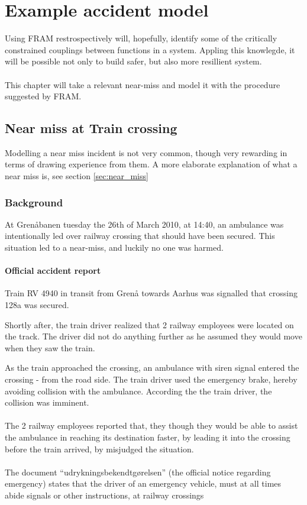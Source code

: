 \chapter{Example accident model}
\label{ch:accident_model}
Using FRAM restrospectively will, hopefully, identify some of the critically constrained couplings between functions in a system. Appling this knowlegde, it will be possible not only to build safer, but also more resillient system.\\
\\
This chapter will take a relevant near-miss and model it with the procedure suggested by FRAM. 

\section{Near miss at Train crossing}
Modelling a near miss incident is not very common, though very rewarding in terms of drawing experience from them. A more elaborate explanation of what a near miss is, see section \ref{sec:near_miss}


\subsection{Background}
At Grenåbanen tuesday the 26th of March 2010, at 14:40, an ambulance was intentionally led over railway crossing that should have been secured. This situation led to a near-miss, and luckily no one was harmed.

\subsubsection{Official accident report}
Train RV 4940 in transit from Grenå towards Aarhus was signalled that crossing 128a was secured.

Shortly after, the train driver realized that 2 railway employees were located on the track. The driver did not do anything further as he assumed they would move when they saw the train.

As the train approached the crossing, an ambulance with siren signal entered the crossing - from the road side. The train driver used the emergency brake, hereby avoiding collision with the ambulance. According the the train driver, the collision was imminent.\\
\\
The 2 railway employees reported that, they though they would be able to assist the ambulance in reaching its destination faster, by leading it into the crossing before the train arrived, by misjudged the situation.\\
\\
The document ``udrykningsbekendtgørelsen'' (the official notice regarding emergency) states that the driver of an emergency vehicle, must at all times abide signals or other instructions, at railway crossings

